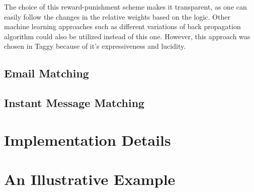 The choice of this reward-punishment scheme makes it transparent, as one can easily follow the changes in the relative weights based on the logic. Other machine learning approaches such as different variations of back propagation algorithm could also be utilized instead of this one. However, this approach was chosen in Taggy because of it's expressiveness and lucidity.

	\subsection{Email Matching}
	\subsection{Instant Message Matching}
\section{Implementation Details}
\section{An Illustrative Example}	
